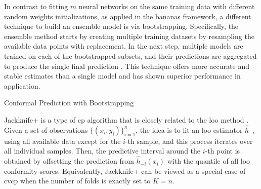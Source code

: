 In contrast to fitting $m$ neural networks on the same training data with different random weights initializations, as applied in the \gls{bananas} framework, a different technique to build an ensemble model is via bootstrapping. Specifically, the ensemble method starts by creating multiple training datasets by resampling the available data points with replacement. In the next step, multiple models are trained on each of the bootstrapped subsets, and their predictions are aggregated to produce the single final prediction \cite{breiman96}. This technique offers more accurate and stable estimates than a single model and has shown superior performance in application.

\begin{algorithm}[t]
  \caption{Conformal Prediction with Bootstrapping}
  \label{alg:BtCP}
  \begin{algorithmic}[1]
    \textbf{Input:} 
    A set of observations $\{(x_{i}, y_{i})\}_{i=1}^n$, number of bootstraps $B$, a prediction algorithm $h(\cdot)$, a non-conformity measure $\myfunc{s(\cdot)}$, nominal mis-coverage rate $\tau$, test data $x_{n+1}$. \vskip
    \textbf{Output:} a prediction set $\mathcal{C}_{\tau}(x_{n+1})}$ that covers $y_{n+1}$ with probability $1-\tau$. \vskip
    \vspace{0.5em}
    \STATE Sample all available data with replacement and create $B$ subsets. $I_b$ denotes the indices of data points included in the $b$-th sample.
    \STATE Train $\hat{h}_{b}(\cdot)$ on $\{(x_{i}, y_{i}) \mid i \in I_b\}$ for $b$ in 1, 2, ..., B
    \STATE Initialise a conformity scoring set $S=\emptyset$
    \FOR {$i$ in 1, 2, ..., n}
    	\begin{enumerate}
    		\STATE Initialize an empty for leave-one-out estimates $LOO_i=\emptyset$
    		\STATE For {$b$ in 1, 2, ..., B},  if {$i$ \notin \; $I_b$}\;: $LOO_i \leftarrow{LOO_i \cup \hat{h}_b(x_i)}$ 
			\STATE S \gets S \cup s\big(aggregate(LOO_i),\; y_i\big)
		\end{enumerate}
    \ENDFOR
	\STATE Predict $x_{n+1}$: $h(x_{n+1}) \leftarrow aggregate(\{\hat{h}_{1}(x_{n+1}), ..., \hat{h}_{B}(x_{n+1})\})$ 
	\STATE Return $\mathcal{C}_{\tau}(x_{n+1}) \leftarrow \{y \,|\, s((h(x_{n+1}), y) \leq q\}$, where $q$ is the $\lceil(1-\tau)(n_s+1)\rceil$-th smallest value of $S$, with $n_s = |S|$.
    \end{algorithmic}
\end{algorithm}

Jackknife+ is a type of \gls{cp} algorithm that is closely related to the \gls{loo} method \cite{barber2020jackknife}. Given a set of observations $\{(x_{i}, y_{i})\}_{i=1}^n$, the idea is to fit an \gls{loo} estimator $\hat{h}_{-i}$ using all available data except for the $i$-th sample, and this process iterates over all individual samples. Then, the predictive interval around the $i$-th point is obtained by offsetting the prediction from $\hat{h}_{-i}(x_i)$ with the quantile of all \gls{loo} conformity scores.  Equivalently, Jackknife+ can be viewed as a special case of \gls{cvcp} when the number of folds is exactly set to $K=n$.

